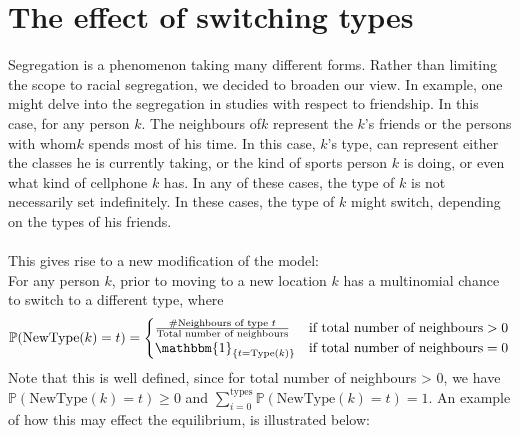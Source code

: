 \section{The effect of switching types}
Segregation is a phenomenon taking many different forms. Rather than  limiting the scope to racial segregation, we decided to broaden our view. 
In example, one might delve into the segregation in studies with respect to friendship. 
In this case, for any person \(k\). The neighbours of\(k\) represent the \(k\)'s friends or the persons with whom\(k\) spends most of his time.
In this case, \(k\)'s type, can represent either the classes he is currently taking, or the kind of sports person \(k\) is doing, or even what kind of cellphone \(k\) has.
In any of these cases, the type of \(k\) is not necessarily set indefinitely.
In these cases, the type of \(k\) might switch, depending on the types of his friends.\\
\\
This gives rise to a new modification of the model:\\
For any person \(k\), prior to moving to a new location \(k\) has a multinomial chance to switch to a different type, where 
\[\mathbb{P}(\text{NewType}(k)=t) = \begin{cases} 
 \frac{\#\text{Neighbours of type }t}{\text{Total number of neighbours}}	&\mbox{if } \text{total number of neighbours}>0 \\ 
\mathbbm{1}_{\{t=\text{Type}(k)\}}   &\mbox{if } \text{total number of neighbours}=0
\end{cases}\]
Note that this is well defined, since for total number of neighbours > 0, we have \( \mathbb{P}(\text{NewType}(k)=t) \geq 0\) and \(\sum_{i=0}^{\text{types}}\mathbb{P}(\text{NewType}(k)=t)=1\). An example of how this may effect the equilibrium, is illustrated below:
